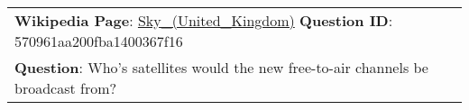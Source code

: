 \begin{figure*}[ht]
{\begin{tabular}{p{}}
            \textbf{Wikipedia Page}: \underline{Sky\_(United\_Kingdom)} \textbf{Question ID}: 570961aa200fba1400367f16                                                                                                                                                                                                                                                                                                                                                                                                                                                                                                                                                                                                                                                                                                                                                                                                                                                                                                                                                                                                                                \\
            \textbf{Question}: Who's satellites would the new free-to-air channels be broadcast from?                                                                                                                                                                                                                                                                                                                                                                                                                                                                                                                                                                                                                                                                                                                                                                                                                                                                                                                                                                                                                                                 \\

\end{tabular}}
\end{figure*}
